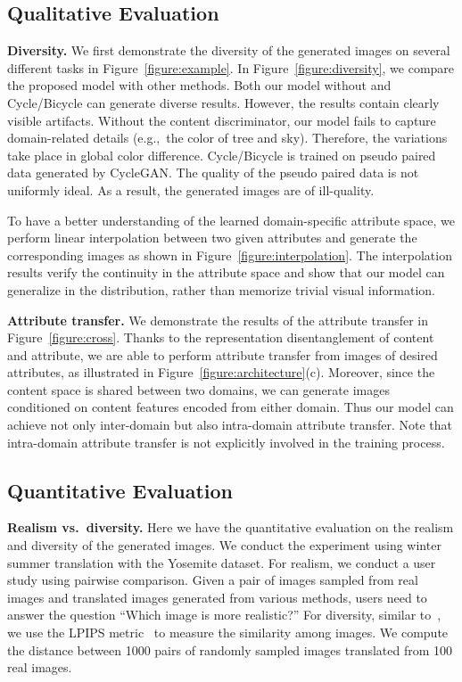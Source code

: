\documentclass[runningheads]{llncs}
\newlength\paramargin
\newlength\secmargin
\newlength\subsecmargin
\newcommand{\Paragraph}[1]
{\vspace{2mm} \noindent \textbf{#1}}
\def\eg{e.g.,~}
\def\vs{vs.~}
\newcommand{\figref}[1]{Figure~\ref{figure:#1}}
\begin{document}
\subsection{Qualitative Evaluation}
\vspace{-1mm}
\Paragraph{Diversity.} We first demonstrate the diversity of the generated images on several different tasks in \figref{example}.
In \figref{diversity}, we compare the proposed model with other methods. 
Both our model without  and Cycle/Bicycle can generate diverse results. 
However, the results contain clearly visible artifacts. 
Without the content discriminator, our model fails to capture domain-related details (\eg the color of tree and sky).
Therefore, the variations take place in global color difference.
Cycle/Bicycle is trained on pseudo paired data generated by CycleGAN.
The quality of the pseudo paired data is not uniformly ideal.
As a result, the generated images are of ill-quality.


To have a better understanding of the learned domain-specific attribute space, we perform linear interpolation between two given attributes and generate the corresponding images as shown in \figref{interpolation}.
The interpolation results verify the continuity in the attribute space and show that our model can generalize in the distribution, rather than memorize trivial visual information.

\vspace{\paramargin}
\Paragraph{Attribute transfer.} 
We demonstrate the results of the attribute transfer in \figref{cross}.
Thanks to the representation disentanglement of content and attribute, we are able to perform attribute transfer from images of desired attributes, as illustrated in \figref{architecture}(c).
Moreover, since the content space is shared between two domains, we can generate images conditioned on content features encoded from either domain.
Thus our model can achieve not only inter-domain but also intra-domain attribute transfer.
Note that intra-domain attribute transfer is not explicitly involved in the training process.





\subsection{Quantitative Evaluation}
 \vspace{\subsecmargin}
\Paragraph{Realism \vs diversity.} 
Here we have the quantitative evaluation on the realism and diversity of the generated images.
We conduct the experiment using winter  summer translation with the Yosemite dataset.
For realism, we conduct a user study using pairwise comparison.
Given a pair of images sampled from real images and translated images generated from various methods, users need to answer the question  ``Which image is more realistic?''
For diversity, similar to~\cite{zhu2017bicyclegan}, we use the LPIPS metric~\cite{zhang2018perceptual} to measure the similarity among images.
We compute the distance between 1000 pairs of randomly sampled images translated from 100 real images.
\end{document}
